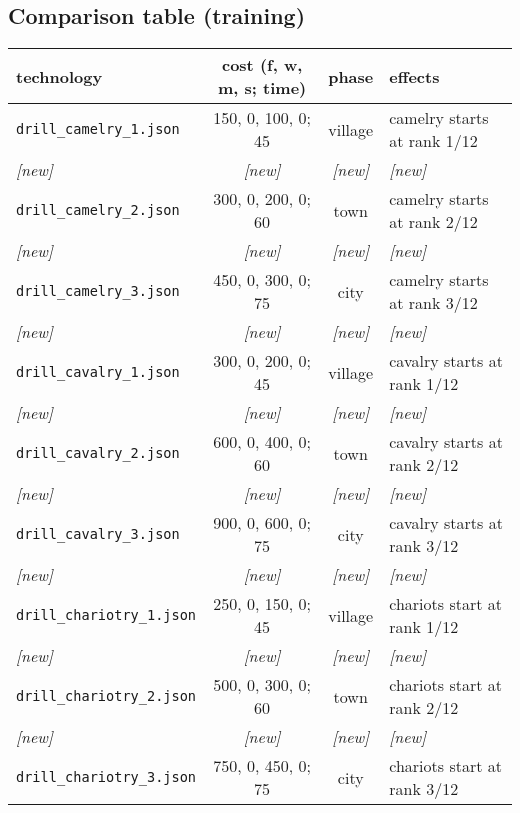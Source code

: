 \documentclass{article}
\begin{document}
\clearpage
\subsection{Comparison table (training)}
\begin{tabular}{l|cc|l}
{\bf technology} & {{\bf cost} (f, w, m, s; time)} & {\bf phase} & {\bf effects} \\
\hline
\verb+drill_camelry_1.json+                  &   150,    0,  100,    0;  45  & village    & camelry starts at rank 1/12 \\
\emph{[new]} & \emph{[new]} & \emph{[new]} & \emph{[new]} \\
\hline
\verb+drill_camelry_2.json+                  &   300,    0,  200,    0;  60  & town       & camelry starts at rank 2/12 \\
\emph{[new]} & \emph{[new]} & \emph{[new]} & \emph{[new]} \\
\hline
\verb+drill_camelry_3.json+                  &   450,    0,  300,    0;  75  & city       & camelry starts at rank 3/12 \\
\emph{[new]} & \emph{[new]} & \emph{[new]} & \emph{[new]} \\
\hline
\verb+drill_cavalry_1.json+                  &   300,    0,  200,    0;  45  & village    & cavalry starts at rank 1/12 \\
\emph{[new]} & \emph{[new]} & \emph{[new]} & \emph{[new]} \\
\hline
\verb+drill_cavalry_2.json+                  &   600,    0,  400,    0;  60  & town       & cavalry starts at rank 2/12 \\
\emph{[new]} & \emph{[new]} & \emph{[new]} & \emph{[new]} \\
\hline
\verb+drill_cavalry_3.json+                  &   900,    0,  600,    0;  75  & city       & cavalry starts at rank 3/12 \\
\emph{[new]} & \emph{[new]} & \emph{[new]} & \emph{[new]} \\
\hline
\verb+drill_chariotry_1.json+                &   250,    0,  150,    0;  45  & village    & chariots start at rank 1/12 \\
\emph{[new]} & \emph{[new]} & \emph{[new]} & \emph{[new]} \\
\hline
\verb+drill_chariotry_2.json+                &   500,    0,  300,    0;  60  & town       & chariots start at rank 2/12 \\
\emph{[new]} & \emph{[new]} & \emph{[new]} & \emph{[new]} \\
\hline
\verb+drill_chariotry_3.json+                &   750,    0,  450,    0;  75  & city       & chariots start at rank 3/12 \\

\end{tabular}
\end{document}
